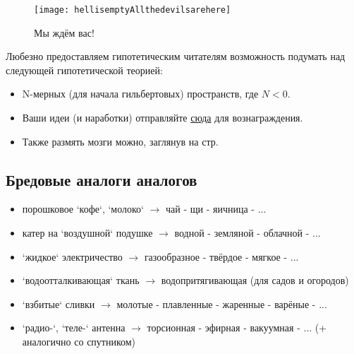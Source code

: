 \begin{figure}[ht!]
    \centering
    \texttt{[image: hellisemptyAllthedevilsarehere]}
    \caption{Мы ждём вас!}
\end{figure}

Любезно предоставляем гипотетическим читателям возможность подумать над следующей гипотетической теорией:
\begin{itemize}
    \item N-мерных (для начала гильбертовых) пространств, где \( N < 0 \).
    \item Ваши идеи (и наработки) отправляйте \href{http://www.abelprize.no/}{сюда} для вознаграждения.
    \item Также размять мозги можно, заглянув на стр. \pageref{mietka}
\end{itemize}

\begin{center}
    \fboxsep=5mm   %
    \fboxrule=5pt  %
\end{center}

\subsection{Бредовые аналоги аналогов}
\begin{itemize}
    \item порошковое `кофе`, `молоко` \( \to \) чай - щи - яичница - ...
    \item катер на `воздушной` подушке \( \to \) водной - земляной - облачной - ...
    \item `жидкое` электричество \( \to \) газообразное - твёрдое - мягкое - ...
    \item `водоотталкивающая` ткань \( \to \) водопритягивающая (для садов и огородов)
    \item `взбитые` сливки \( \to \) молотые - плавленные - жаренные - варёные - ...
    \item `радио-`, `теле-` антенна \( \to \) торсионная - эфирная - вакуумная - ... (+ аналогично со спутником)
\end{itemize}

